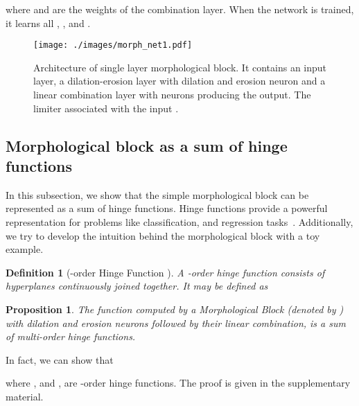 \documentclass{bmvc2k}
\newtheorem{proposition}{Proposition}
\newtheorem{definition}{Definition}
\begin{document}
where  and  are the weights of the combination layer. When the network is trained, it learns all , ,  and . 

\begin{figure}
    \centering
    \texttt{[image: ./images/morph\_net1.pdf]}   
    \caption{Architecture of single layer morphological block. It contains an input layer, a dilation-erosion layer with  dilation and  erosion neuron and a linear combination layer with  neurons producing the output. The limiter associated with the input .}
    \label{fig:single_layer_network}
\end{figure}

\subsection{Morphological block as a sum of hinge functions}
In this subsection, we show that the simple morphological block can be represented as a sum of hinge functions. 
Hinge functions provide a powerful representation for problems like classification, and regression tasks~\cite{breiman1993hinging}. 
Additionally, we try to develop the intuition behind the morphological block with a toy example. 


\begin{definition}[-order Hinge Function \cite{wang2005generalization}]
    A -order hinge function  consists of  hyperplanes continuously joined together. It may be defined as 
    
\end{definition}


\begin{proposition}
\label{th:gx_sum_hinge}
The function computed by a Morphological Block (denoted by ) with  dilation and  erosion neurons followed by their linear combination, is a sum of multi-order hinge functions.
\end{proposition}
\noindent In fact, we can show that 

where ,  and , are -order hinge functions. The proof is given in the supplementary material.
\end{document}
